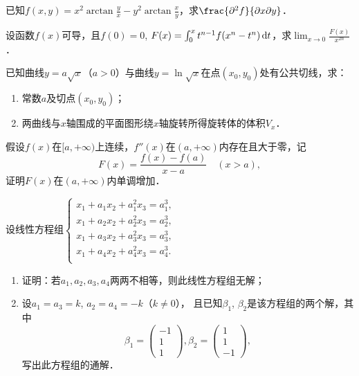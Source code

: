 \documentclass[plain,noanswer,medmath]{../../template/jnuexam}
\begin{document}

\begin{problem}
已知$f(x,y) = x^2\arctan \frac{y}{x} - y^2\arctan \frac{x}{y}$，求$\frac{\pd^2 f}{\pdx\pd y}$．
\end{problem}



\begin{problem}
设函数$f(x)$可导，且$f(0) = 0$, $F(x) = \int_0^x t^{n - 1} f(x^n - t^n)\mathop{}\!\mathrm{d} t$，求$\lim_{x \to 0} \frac{F(x)}{x^{2n}}$．
\end{problem}



\begin{problem}
已知曲线$y = a\sqrt{x}$（$a > 0$）与曲线$y = \ln \sqrt{x}$在点$(x_0,y_0)$处有公共切线，求：
\begin{enumerate}
\item 常数$a$及切点$(x_0,y_0)$；
\item 两曲线与$x$轴围成的平面图形绕$x$轴旋转所得旋转体的体积$V_x$．
\end{enumerate}
\end{problem}



\begin{problem}
假设$f(x)$在$[a, +\infty)$上连续，$f''(x)$在$\left(a, +\infty \right)$内存在且大于零，记
$$F(x) = \frac{f(x) - f(a)}{x - a}\quad (x > a),$$
证明$F(x)$在$\left(a, +\infty \right)$内单调增加．
\end{problem}



\begin{problem}
设线性方程组$\begin{cases}
 x_1 + a_1x_2 + a_1^2x_3 = a_1^3, \\
 x_1 + a_2x_2 + a_2^2x_3 = a_2^3, \\
 x_1 + a_3x_2 + a_3^2x_3 = a_3^3, \\
 x_1 + a_4x_2 + a_4^2x_3 = a_4^3. \\
\end{cases}$
\begin{enumerate}
\item 证明：若$a_1,a_2,a_3,a_4$两两不相等，则此线性方程组无解；
\item 设$a_1 = a_3 = k$, $a_2 = a_4 = - k$（$k \ne 0$），
      且已知$\beta_1$, $\beta_2$是该方程组的两个解，其中
$$\beta_1 = \begin{pmatrix}
  -1 \\
  1 \\
  1
\end{pmatrix},\beta_2 = \begin{pmatrix}
  1 \\
  1 \\
  -1
\end{pmatrix},$$
写出此方程组的通解．
\end{enumerate}
\end{problem}
\end{document}
